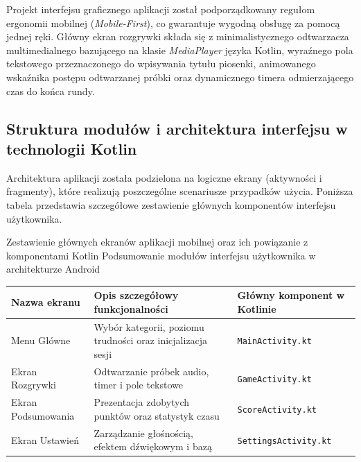 

\hspace{0.60cm}Projekt interfejsu graficznego aplikacji został podporządkowany regułom ergonomii mobilnej (\textit{Mobile-First}), co gwarantuje wygodną obsługę za pomocą jednej ręki. Główny ekran rozgrywki składa się z minimalistycznego odtwarzacza multimedialnego bazującego na klasie \textit{MediaPlayer} języka Kotlin, wyraźnego pola tekstowego przeznaczonego do wpisywania tytułu piosenki, animowanego wskaźnika postępu odtwarzanej próbki oraz dynamicznego timera odmierzającego czas do końca rundy.

\subsection{Struktura modułów i architektura interfejsu w technologii Kotlin}

\hspace{0.60cm}Architektura aplikacji została podzielona na logiczne ekrany (aktywności i fragmenty), które realizują poszczególne scenariusze przypadków użycia. Poniższa tabela przedstawia szczegółowe zestawienie głównych komponentów interfejsu użytkownika.

\begin{tabela}
	{Zestawienie głównych ekranów aplikacji mobilnej oraz ich powiązanie z komponentami Kotlin}	%
	{Podsumowanie modułów interfejsu użytkownika w architekturze Android}	%
	{
		\begin{tabular}{|l|p{6.5cm}|l|} \hline
			\textbf{Nazwa ekranu} & \textbf{Opis szczegółowy funkcjonalności} & \textbf{Główny komponent w Kotlinie} \\ \hline
			Menu Główne & Wybór kategorii, poziomu trudności oraz inicjalizacja sesji & \texttt{MainActivity.kt} \\ \hline
			Ekran Rozgrywki & Odtwarzanie próbek audio, timer i pole tekstowe & \texttt{GameActivity.kt} \\ \hline
			Ekran Podsumowania & Prezentacja zdobytych punktów oraz statystyk czasu & \texttt{ScoreActivity.kt} \\ \hline
			Ekran Ustawień & Zarządzanie głośnością, efektem dźwiękowym i bazą & \texttt{SettingsActivity.kt} \\ \hline
		\end{tabular}
	}
	\label{tab:tablica001}
\end{tabela}

